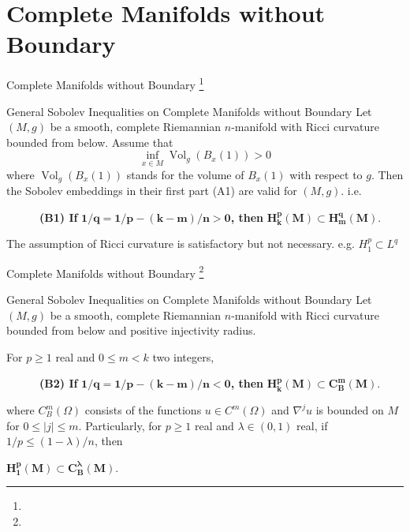 \documentclass[xcolor=table,dvipsnames,svgnames,aspectratio=169,fontset=fandol]{ctexbeamer}
\begin{document}

\section{Complete Manifolds without Boundary}

\begin{frame}{Complete Manifolds without Boundary \footnote{} }
  \begin{alertblock}{General Sobolev Inequalities on Complete Manifolds without Boundary}
  Let $(M, g)$ be a smooth, complete Riemannian $n$-manifold with Ricci curvature bounded from below. Assume that
  $$
  \inf _{x \in M} \operatorname{Vol}_g\left(B_x(1)\right)>0
  $$
  where $\operatorname{Vol}_g\left(B_x(1)\right)$ stands for the volume of $B_x(1)$ with respect to $g$. Then the Sobolev embeddings in their first part (A1) are valid for $(M, g)$. i.e.
  
  \vskip 5pt
  ~~~~~~\textbf{(B1) If} $\bm{1/q=1 / p-(k-m) / n > 0}$\textbf{, then} $\bm{H_k^p(M) \subset H_m^q(M)}$.
\end{alertblock}
The assumption of Ricci curvature is satisfactory but not necessary. e.g. $H_1^p\subset L^q$
\end{frame}

\begin{frame}{Complete Manifolds without Boundary \footnote{} }
  \begin{alertblock}{General Sobolev Inequalities on Complete Manifolds without Boundary}
    Let $(M, g)$ be a smooth, complete Riemannian $n$-manifold with Ricci curvature bounded from below and positive injectivity radius. 
    
    \vskip 5pt
    For $p \geq 1$ real and $0\leq m<k$ two integers,   
  
    \vskip 8pt
  ~~~~~~\textbf{(B2) If} $\bm{1/q=1 / p-(k-m) / n < 0}$\textbf{, then} $\bm{H_k^p(M) \subset C_B^m(M)}$.
  
    \vskip 8pt
    where $C_B^m(\Omega)$ consists of the functions $u \in C^m(\Omega)$ and $\nabla^ju$ is bounded on $M$ for $0\leq |j|\leq m$. 
    Particularly, for $p \geq 1$ real and $\lambda \in(0,1)$ real, if $1 / p \leq(1-\lambda) / n$, then 
    
    \vskip 3pt
    $\bm{H_1^p(M) \subset C_B^\lambda(M)}$.



\end{alertblock}
\end{frame}
\end{document}
